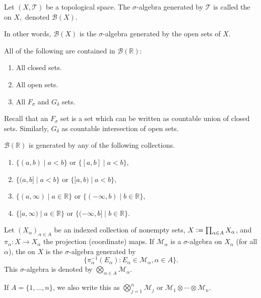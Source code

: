 \documentclass[12pt]{article}	%
\begin{document}
\begin{defn}
	Let $(X, \mathcal{T})$ be a topological space. The $\sigma$-algebra generated by $\mathcal{T}$ is called the  on $X,$ denoted $\mathcal{B}(X).$
\end{defn}
In other words, $\mathcal{B}(X)$ is the $\sigma$-algebra generated by the open sets of $X.$

\begin{prop}
	All of the following are contained in $\mathcal{B}(\mathbb{R})$:
	\begin{enumerate}
		\item All closed sets.
		\item All open sets.
		\item All $F_\sigma$ and $G_\delta$ sets.
	\end{enumerate}
\end{prop}
Recall that an $F_\sigma$ set is a set which can be written as countable union of closed sets. Similarly, $G_\delta$ as countable intersection of open sets.

\begin{prop}
	$\mathcal{B}(\mathbb{R})$ is generated by any of the following collections.
	\begin{enumerate}
		\item $\{(a, b) \mid a < b\}$ or $\{[a, b] \mid a < b\},$
		\item $\{(a, b] \mid a < b\}$ or $\{[a, b) \mid a < b\},$
		\item $\{(a, \infty) \mid a \in \mathbb{R}\}$ or $\{(-\infty, b) \mid b \in \mathbb{R}\},$
		\item $\{[a, \infty) \mid a \in \mathbb{R}\}$ or $\{(-\infty, b] \mid b \in \mathbb{R}\}.$
	\end{enumerate}
\end{prop}

\begin{defn}
	Let $(X_{\alpha})_{\alpha \in A}$ be an indexed collection of nonempty sets, $X \vcentcolon= \prod_{\alpha \in A} X_{\alpha}$, and $\pi_{\alpha} : X \to X_{\alpha}$ the projection (coordinate) maps. If $\mathcal{M}_{\alpha}$ is a $\sigma$-algebra on $X_{\alpha}$ (for all $\alpha$), the  on $X$ is the $\sigma$-algebra generated by
	\begin{equation*} 
		\{\pi_{\alpha}^{-1}(E_{\alpha}) : E_{\alpha} \in \mathcal{M}_{\alpha}, \alpha \in A\}.
	\end{equation*}
	This $\sigma$-algebra is denoted by $\bigotimes_{\alpha \in A} \mathcal{M}_{\alpha}$. 

	If $A = \{1, \ldots, n\}$, we also write this as $\bigotimes_{j = 1}^{n} \mathcal{M}_{j}$ or $\mathcal{M}_{1} \otimes \cdots \otimes \mathcal{M}_{n}$.
\end{defn}
\end{document}
